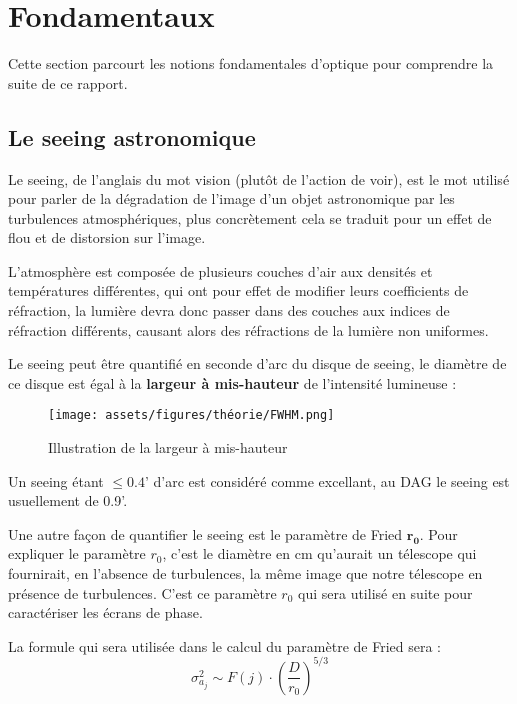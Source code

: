 \section{Fondamentaux}
Cette section parcourt les notions fondamentales d'optique pour comprendre la suite de ce rapport.

\subsection{Le seeing astronomique}
Le seeing, de l'anglais du mot vision (plutôt de l'action de voir), est le mot utilisé pour parler de la dégradation de l'image
d'un objet astronomique par les turbulences atmosphériques, plus concrètement cela se traduit pour un effet de flou et de distorsion sur l'image.

L'atmosphère est composée de plusieurs couches d'air aux densités et températures différentes, qui ont pour effet de modifier leurs coefficients de réfraction, la lumière devra donc passer
dans des couches aux indices de réfraction différents, causant alors des réfractions de la lumière non uniformes.

Le seeing peut être quantifié en seconde d'arc du disque de seeing, le diamètre de ce disque est égal à la \textbf{largeur à mis-hauteur} de l'intensité lumineuse :
\begin{figure}[H]
  \centering
  \texttt{[image: assets/figures/théorie/FWHM.png]}
  \caption[Illustration de la LMH]{Illustration de la largeur à mis-hauteur \autocite{largeur_mis_hauteur}\footnotemark}\label{fig:largeur_mis_hauteur}
\end{figure}

Un seeing étant $\leq  0.4$' d'arc est considéré comme excellant, au DAG le seeing est usuellement de 0.9'.

Une autre façon de quantifier le seeing est le paramètre de Fried $\mathbf{r_0}$. Pour expliquer le paramètre $r_0$, c'est le diamètre en cm qu'aurait un télescope
qui fournirait, en l'absence de turbulences, la même image que notre télescope en présence de turbulences. C'est ce paramètre $r_0$ qui sera utilisé en suite pour caractériser les écrans de phase.

La formule qui sera utilisée dans le calcul du paramètre de Fried sera :
\begin{equation}
  \sigma_{a_j}^2 \sim F(j) \cdot (\frac{D}{r_0})^{5/3}
\end{equation}

